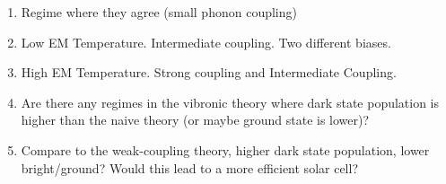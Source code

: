 \documentclass[]{article}
\begin{document}
\iffalse
\begin{figure}[t]
	\centering
	\begin{minipage}[b]{0.325\textwidth}
		\texttt{[image: "C:/Users/mbcxrhm2/Dropbox/PhD/1st year/".png]}
		\caption{Naive small phonon coupling, low temperature}
		\label{fig:}
	\end{minipage}
	\begin{minipage}[b]{0.325\textwidth}
		\texttt{[image: "C:/Users/mbcxrhm2/Dropbox/PhD/1st year/".png]}
		\caption{Naive large phonon coupling, low temperature}
		\label{fig:a100_T6000}
	\end{minipage}
	\begin{minipage}[b]{0.325\textwidth}
		\texttt{[image: "C:/Users/mbcxrhm2/Dropbox/PhD/1st year/".png]}
		\caption{Naive large phonon coupling, high temperature}
		\label{fig:a500_T6000}
	\end{minipage}
\end{figure}
\begin{figure}[t]
	\centering
	\begin{minipage}[b]{0.325\textwidth}
		\texttt{[image: "C:/Users/mbcxrhm2/Dropbox/PhD/1st year/".png]}
		\caption{Vibronic small phonon coupling, low temperature}
		\label{fig:a300_T6000}
	\end{minipage}
	\begin{minipage}[b]{0.325\textwidth}
		\texttt{[image: "C:/Users/mbcxrhm2/Dropbox/PhD/1st year/".png]}
		\caption{Vibronic large phonon coupling, low temperature}
		\label{fig:a300_T300}
	\end{minipage}
	\begin{minipage}[b]{0.325\textwidth}
		\texttt{[image: "C:/Users/mbcxrhm2/Dropbox/PhD/1st year/".png]}
		\caption{Vibronic large phonon coupling, high temperature}
		\label{fig:a300_T6000}
	\end{minipage}
\end{figure}
\fi
\begin{enumerate}
	\item Regime where they agree (small phonon coupling)
	\item Low EM Temperature. Intermediate coupling. Two different biases.
	\item High EM Temperature. Strong coupling and Intermediate Coupling.
	\item  Are there any regimes in the vibronic theory where dark state population is higher than the naive theory (or maybe ground state is lower)?
	\item Compare to the weak-coupling theory, higher dark state population, lower bright/ground? Would this lead to a more efficient solar cell?
\end{enumerate}
\end{document}

